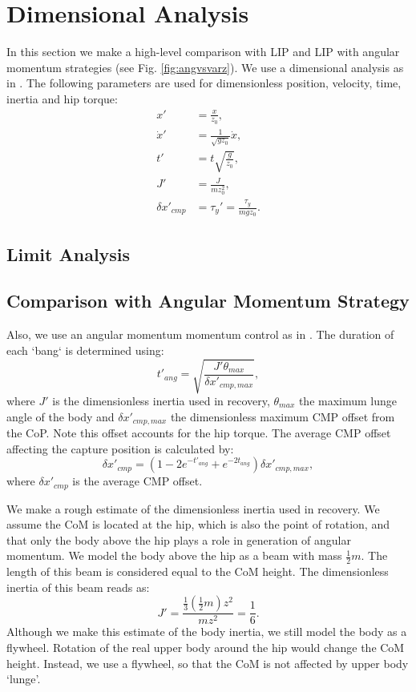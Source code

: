 \documentclass[letterpaper, 10 pt, conference]{ieeeconf}  %
\begin{document}
\section{Dimensional Analysis}\label{sec:comparison}
In this section we make a high-level comparison with LIP and LIP with angular momentum strategies (see Fig. \ref{fig:angvsvarz}). We use a dimensional analysis as in \cite{pratt2006capture,stephens2007humanoid,koolen2012capturability}. The following parameters are used for dimensionless position, velocity, time, inertia and hip torque:
\begin{align}
	x' &= \frac{x}{z_0}, \\
	\dot{x}' &= \frac{1}{\sqrt{gz_0}}\dot{x},\\
	t' &= t\sqrt{\frac{g}{z_0}},\\
	J' &= \frac{J}{mz_0^2},\\
	\delta x'_{cmp} &= \tau_y' = \frac{\tau_y}{mgz_0}.
\end{align}
\subsection{Limit Analysis}

\subsection{Comparison with Angular Momentum Strategy}
Also, we use an angular momentum momentum control as in \cite{pratt2006capture,stephens2007humanoid,koolen2012capturability}. The duration of each `bang` is determined using:
\begin{equation}	
	t'_{ang} = \sqrt{\frac{J'\theta_{max}}{\delta x'_{cmp,max}}},
\end{equation}
where $J'$ is the dimensionless inertia used in recovery, $\theta_{max}$ the maximum lunge angle of the body and $\delta x'_{cmp,max}$ the dimensionless maximum CMP offset from the CoP. Note this offset accounts for the hip torque. The average CMP offset affecting the capture position is calculated by:
\begin{equation}
 \delta x'_{cmp} = (1 -2e^{-t'_{ang}}+e^{-2t_{ang}})\delta x'_{cmp,max},
\end{equation}
where $\delta x'_{cmp}$ is the average CMP offset.

We make a rough estimate of the dimensionless inertia used in recovery. We assume the CoM is located at the hip, which is also the point of rotation, and that only the body above the hip plays a role in generation of angular momentum. We model the body above the hip as a beam with mass $\frac{1}{2}m$. The length of this beam is considered equal to the CoM height. The dimensionless inertia of this beam reads as:
\begin{equation}
	J' = \frac{\frac{1}{3}(\frac{1}{2}m)z^2}{mz^2} = \frac{1}{6}.
\end{equation}
Although we make this estimate of the body inertia, we still model the body as a flywheel. Rotation of the real upper body around the hip would change the CoM height. Instead, we use a flywheel, so that the CoM is not affected by upper body `lunge'.
\end{document}
